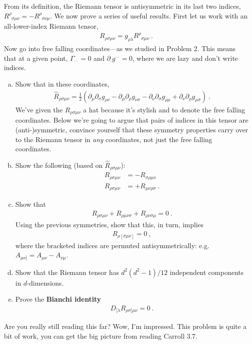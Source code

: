 \documentclass[12pt]{article}
\numberwithin{equation}{section}    %
\begin{document}
From its definition, the Riemann tensor is antisymmetric in its last two indices, $R^\rho_{\phantom{\rho}\sigma \mu\nu} = -R^\rho_{\phantom{\rho}\sigma \nu \mu}$. We now prove a series of useful results. First let us work with an all-lower-index Riemann tensor,
\begin{align}
	R_{{\rho}\sigma \mu\nu} = g_{\rho\lambda}R^\rho_{\phantom{\rho}\sigma \mu\nu} \ .
\end{align}
Now go into free falling coordinates---as we studied in Problem 2. This means that at a given point, $\Gamma^\cdot_{\cdot\cdot} = 0$ and $\partial_\cdot g^{\cdot\cdot} = 0$, where we are lazy and don't write indices. 
\begin{enumerate}[(a)]
	\item Show that in these coordinates,
\begin{align}
	\hat{R}_{\rho \sigma \mu\nu} = \frac 12
	\left(
	  \partial_\mu \partial_\sigma g_{\rho\nu}
	- \partial_\mu \partial_\rho g_{\nu\sigma}
	- \partial_\nu \partial_\sigma g_{\rho\mu}
	+ \partial_\nu \partial_\rho g_{\mu\sigma}
	\right) \ .
\end{align}
We've given the $\hat{R}_{{\rho}\sigma \mu\nu}$ a hat because it's stylish and to denote the free falling coordinates.
Below we're going to argue that pairs of indices in this tensor are (anti-)symmetric, convince yourself that these symmetry properties carry over to the Riemann tensor in \emph{any} coordinates, not just the free falling coordinates.
\item Show the following (based on $\hat{R}_{{\rho}\sigma \mu\nu}$):
\begin{align}
	R_{\rho \sigma \mu\nu} & = - R_{\sigma \rho \mu\nu}
	\\
	R_{\rho \sigma \mu\nu} & = + R_{\mu\nu \rho \sigma } \ .
\end{align}
\item Show that
\begin{align}
	R_{\rho \sigma \mu\nu} + R_{\rho  \mu\nu \sigma} + R_{\rho  \nu\sigma \mu} = 0 \ .
\end{align}
Using the previous symmetries, show that this, in turn, implies
\begin{align}
	R_{\rho [\sigma \mu\nu]} = 0 \ ,
\end{align}
where the bracketed indices are permuted antisymmetrically: e.g. $A_{\mu\nu]} = A_{\mu\nu} - A_{\nu\mu}$. 
\item Show that the Riemann tensor has $d^2(d^2-1)/12$ independent components in $d$-dimensions. 
\item Prove the \textbf{Bianchi identity}
\begin{align}
	D_{[\lambda}R_{\rho\sigma]\mu\nu} = 0 \ .
\end{align}
\end{enumerate}
Are you really still reading this far? Wow, I'm impressed. This problem is quite a bit of work, you can get the big picture from reading Carroll 3.7. 




%
\end{document}
